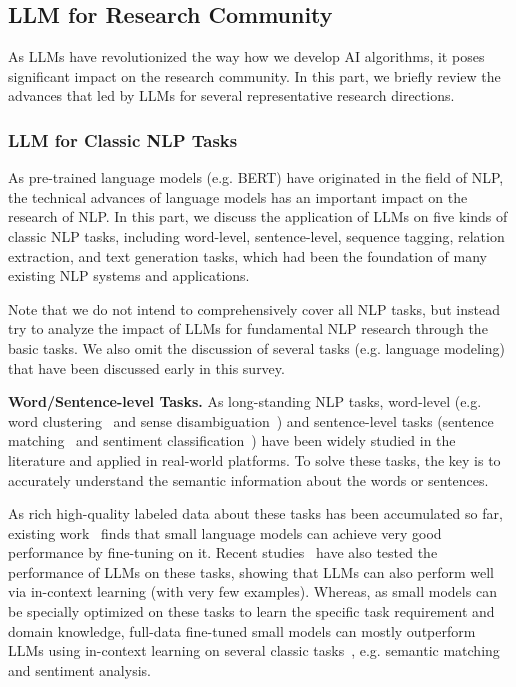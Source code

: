 {{\subsection{LLM for Research Community} \label{sec:llm4community}
As LLMs have revolutionized the way how we develop AI algorithms, it poses significant impact on the research community. In this part, we briefly review the advances that led by LLMs for  several representative research directions.  

\subsubsection{LLM for Classic NLP Tasks} As pre-trained language models (e.g. BERT) have originated in the field of NLP, the technical advances of language models has an important impact on the research of NLP. In this part, we discuss the application of LLMs on five kinds of classic NLP tasks, including word-level, sentence-level, sequence tagging, relation extraction, and text generation tasks, which had been the foundation of many existing NLP systems and applications.   

Note that we do not intend to comprehensively cover all NLP tasks, but instead try to analyze the impact of LLMs for fundamental NLP research through the basic tasks. We also omit the discussion of several tasks (e.g. language modeling) that have been discussed early in this survey. 

\textbf{Word/Sentence-level Tasks.} As long-standing NLP tasks, word-level (e.g. word clustering~\cite{Martin-Speech-1998-clustering} and sense disambiguation~\cite{Navigli-ACM-2009-disambiguation}) and sentence-level tasks (sentence matching~\cite{Gomaa-International-2013-similarity} and sentiment classification~\cite{Minaee-ACM-2021-classification}) have been widely studied in the literature and applied in real-world platforms. To solve these tasks, the key is to accurately understand the semantic information about the words or sentences.

As rich high-quality labeled data about these tasks has been accumulated so far, existing work~\cite{qiu-CoRR-2020-PTM,Devlin-NAACL-2019-BERT} finds that small language models can achieve very good performance by fine-tuning on it. Recent studies~\cite{Brown-NeurIPS-2020-Language,Alex-NIPS-2021-RAFT} have also tested the performance of LLMs on these tasks, showing that LLMs can also perform well via in-context learning (with very few examples). Whereas,  {as small models can be specially optimized on these tasks to learn the specific task requirement  and domain knowledge}, full-data fine-tuned small models can mostly outperform LLMs using in-context learning on several classic tasks~\cite{Qin-arxiv-2023-Is,Chen-arxiv-2023-Robust}, e.g. semantic matching and sentiment analysis. 

}}
